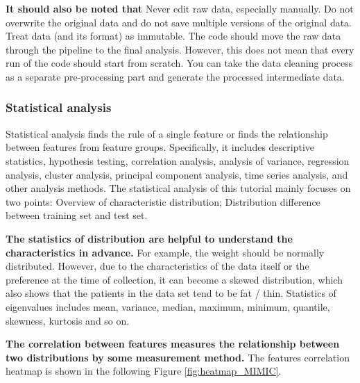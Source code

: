 \textbf{It should also be noted that}
Never edit raw data, especially manually. Do not overwrite the original data and do not save multiple versions of the original data. Treat data (and its format) as immutable. The code should move the raw data through the pipeline to the final analysis. However, this does not mean that every run of the code should start from scratch. You can take the data cleaning process as a separate pre-processing part and generate the processed intermediate data.

\subsubsection{Statistical analysis}%
Statistical analysis finds the rule of a single feature or finds the relationship between features from feature groups. Specifically, it includes descriptive statistics, hypothesis testing, correlation analysis, analysis of variance, regression analysis, cluster analysis, principal component analysis, time series analysis, and other analysis methods. The statistical analysis of this tutorial mainly focuses on two points: Overview of characteristic distribution; Distribution difference between training set and test set.

\textbf{The statistics of distribution are helpful to understand the characteristics in advance.} For example, the weight should be normally distributed. However, due to the characteristics of the data itself or the preference at the time of collection, it can become a skewed distribution, which also shows that the patients in the data set tend to be fat / thin. Statistics of eigenvalues includes mean, variance, median, maximum, minimum, quantile, skewness, kurtosis and so on.

\textbf{The correlation between features measures the relationship between two distributions by some measurement method.} The features correlation heatmap is shown in the following Figure \ref{fig:heatmap_MIMIC}. 

